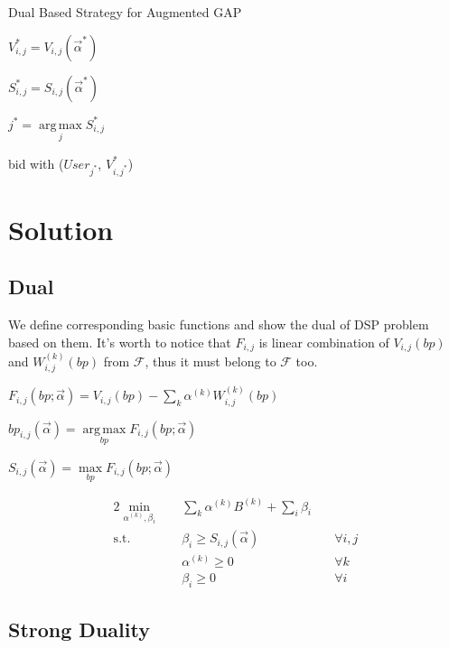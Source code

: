 \documentclass[sigconf]{acmart}
\DeclareMathOperator*{\argmax}{arg\,max}
\newcommand{\sumi}{\sum\limits_i}
\newcommand{\sumk}{\sum\limits_k}
\newcommand{\sbp}{bp_{i,j}}
\newcommand{\sV}{V_{i,j}}
\newcommand{\sW}{W_{i,j}^{(k)}}
\newcommand{\sB}{B^{(k)}}
\newcommand{\salpha}{\alpha^{(k)}}
\newcommand{\sbeta}{\beta_i}
\newcommand{\sF}{F_{i,j}}
\newcommand{\sS}{S_{i,j}}
\newcommand{\valpha}{\vec{\alpha}}
\newcommand{\uff}{\mathscr{F}}
\newcommand{\scoreconstraint}{\sbeta \ge \sS(\vec{\alpha})}
\begin{document}
\begin{algorithm}
\caption{Dual Based Strategy for Augmented GAP}

{
  {
    $\sV^* = \sV(\valpha^*)$

    $\sS^* = \sS(\valpha^*)$
  }
  $j^* = \argmax\limits_j \sS^*$
  
   { bid with ($User_{j^*}$, $V_{i,j^*}^*$) }
}
\end{algorithm}

\section{Solution}

\subsection{Dual}

We define corresponding basic functions and show the dual of DSP problem based on them.
It's worth to notice that $\sF$ is linear combination of $\sV(bp)$ and $\sW(bp)$ from $\uff$, thus it must belong to $\uff$ too.

\begin{definition}
$\sF(bp; \valpha) = \sV(bp) - \sumk \salpha \sW(bp)$
\end{definition}

\begin{definition}
$\sbp(\valpha) = \argmax\limits_{bp} \sF(bp; \valpha)$
\end{definition}

\begin{definition}
$\sS(\valpha) = \max\limits_{bp} \sF(bp; \valpha)$
\end{definition}

\begin{alignat}{2}
    \min\limits_{\salpha, \sbeta} \quad & \sumk \salpha \sB + \sumi \sbeta \quad & {} \\
    \mbox{s.t.} \quad                   & \scoreconstraint \quad                 & \forall i,j \\
    \quad                               & \salpha \ge 0 \quad                    & \forall k \\
    \quad                               & \sbeta \ge 0 \quad                     & \forall i
\end{alignat}

\subsection{Strong Duality}
\end{document}
